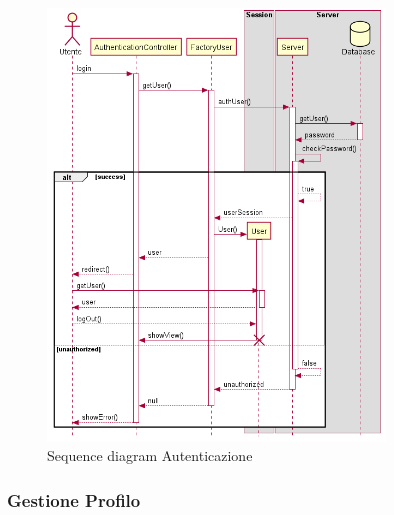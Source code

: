 \documentclass[12pt, a4paper]{report}
\begin{document}

\begin{figure}[h]
  \centering
  \includegraphics[width=0.8\textwidth]{auth_sequence.png}
  \caption{Sequence diagram Autenticazione}
\end{figure}

\newpage

\subsubsection{Gestione Profilo}
\end{document}
